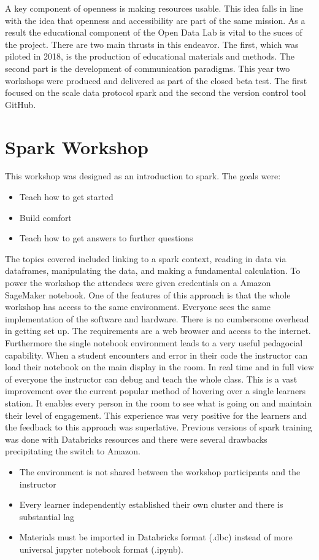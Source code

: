 A key component of openness is making resources usable. This idea falls in line with the idea that openness and accessibility are part of the same mission. As a result the educational component of the Open Data Lab is vital to the suces of the project. There are two main thrusts in this endeavor. The first, which was piloted in 2018, is the production of educational materials and methods. The second part is the development of communication paradigms.
This year two workshops were produced and delivered as part of the closed beta test. The first focused on the scale data protocol spark and the second the version control tool GitHub.

\section{Spark Workshop}
This workshop was designed as an introduction to spark. The goals were:
\begin{itemize}
\item Teach how to get started
\item Build comfort
\item Teach how to get answers to further questions
\end{itemize}
The topics covered included linking to a spark context, reading in data via dataframes, manipulating the data, and making a fundamental calculation.
To power the workshop the attendees were given credentials on a Amazon SageMaker notebook. One of the features of this approach is that the whole workshop has access to the same environment. Everyone sees the same implementation of the software and hardware. There is no cumbersome overhead in getting set up. The requirements are a web browser and access to the internet.
Furthermore the single notebook environment leads to a very useful pedagocial capability. When a student encounters and error in their code the instructor can load their notebook on the main display in the room. In real time and in full view of everyone the instructor can debug and teach the whole class. This is a vast improvement over the current popular method of hovering over a single learners station. It enables every person in the room to see what is going on and maintain their level of engagement. This experience was very positive for the learners and the feedback to this approach was superlative.
Previous versions of spark training was done with Databricks resources and there were several drawbacks precipitating the switch to Amazon.
\begin{itemize}
\item The environment is not shared between the workshop participants and the instructor
\item Every learner independently established their own cluster and there is substantial lag
\item Materials must be imported in Databricks format (.dbc) instead of more universal jupyter notebook format (.ipynb).
\end{itemize}

